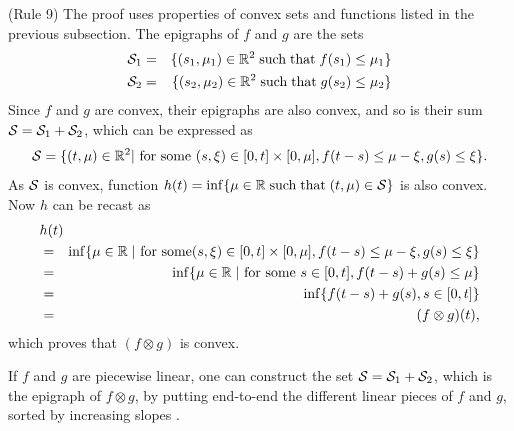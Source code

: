 \vspace{1ex}
\noindent
(Rule 9) The proof uses properties of convex sets and functions listed in the previous subsection.
The epigraphs of $f$ and $g$ are the sets
\begin{eqnarray*}
\mathcal S_1 & = & \{ (s_1,\mu_1) \in \mathbb{R}^2 \mathrm{\; such \; that \; } f(s_1) \leq \mu_1 \} \\
\mathcal S_2 & = & \{ (s_2,\mu_2) \in \mathbb{R}^2 \mathrm{\; such \; that \; } g(s_2) \leq \mu_2 \}
\end{eqnarray*}
Since $f$ and $g$ are convex, their epigraphs are also convex, and so is their sum $\mathcal S = \mathcal S_1 + \mathcal S_2$,
which can be expressed as
$$\mathcal S = \{ (t,\mu) \in \mathbb{R}^2  | \mbox{ for some } (s,\xi) \in [0,t] \times [0,\mu], f(t-s) \leq \mu - \xi,
g(s) \leq \xi \}. $$
As $\mathcal S$ is convex, function $h(t) = \inf \{ \mu \in \mathbb{R} \mathrm{\; such \; that \; } (t,\mu) \in \mathcal S \}$ is also convex.
Now $h$ can be recast as
\begin{eqnarray*}
\lefteqn{ h(t) }\\ & = & \inf \{ \mu \in \Reals \; | \mbox{ for
some} (s,\xi) \in [0,t] \times [0,\mu], f(t-s) \leq \mu - \xi,
g(s) \leq \xi \} \\
    & = & \inf \{ \mu \in \Reals \; | \mbox{ for some } s \in [0,t], f(t-s) + g(s) \leq \mu \} \\
    & = & \inf \{ f(t-s) + g(s),  s \in [0,t] \} \\
    & = & (f \otimes g)(t),
\end{eqnarray*}
which proves that $(f \otimes g)$ is convex.

If $f$ and $g$ are piecewise linear, one can construct the set $\mathcal S = \mathcal S_1 + \mathcal S_2$,
which is the epigraph of $f \otimes g$,
by putting end-to-end the different linear pieces of $f$ and $g$, sorted by increasing slopes
\cite{vecpri96}.

